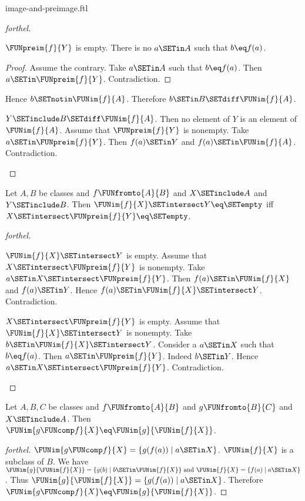 \documentclass{stex}
\begin{document}
\begin{smodule}{image-and-preimage.ftl}
\begin{proof}[forthel]
\begin{case}{$\FUNpreim{f}{Y}$ is empty.}
    There is no $a \SETin A$ such that $b \eq f(a)$.
    \begin{proof}
      Assume the contrary.
      Take $a \SETin A$ such that $b \eq f(a)$.
      Then $a \SETin \FUNpreim{f}{Y}$.
      Contradiction.
    \end{proof}

    Hence $b \SETnotin \FUNim{f}{A}$.
    Therefore $b \SETin B \SETdiff \FUNim{f}{A}$.
  \end{case}

  \begin{case}{$Y \SETinclude B \SETdiff \FUNim{f}{A}$.}
    Then no element of $Y$ is an element of $\FUNim{f}{A}$.
    Assume that $\FUNpreim{f}{Y}$ is nonempty.
    Take $a \SETin \FUNpreim{f}{Y}$.
    Then $f(a) \SETin Y$ and $f(a) \SETin \FUNim{f}{A}$.
    Contradiction.
  \end{case}
\end{proof}

\begin{proposition}[forthel,id=FOUNDATIONS_07_6295504988143616]
  Let $A, B$ be classes and $f \FUNfromto{A}{B}$ and $X \SETinclude A$ and $Y \SETinclude B$.
  Then $\FUNim{f}{X} \SETintersect Y \eq \SETempty$ iff $X \SETintersect \FUNpreim{f}{Y} \eq \SETempty$.
\end{proposition}
\begin{proof}[forthel]
  \begin{case}{$\FUNim{f}{X} \SETintersect Y$ is empty.}
    Assume that $X \SETintersect \FUNpreim{f}{Y}$ is nonempty.
    Take $a \SETin X \SETintersect \FUNpreim{f}{Y}$.
    Then $f(a) \SETin \FUNim{f}{X}$ and $f(a) \SETin Y$.
    Hence $f(a) \SETin \FUNim{f}{X} \SETintersect Y$.
    Contradiction.
  \end{case}

  \begin{case}{$X \SETintersect \FUNpreim{f}{Y}$ is empty.}
    Assume that $\FUNim{f}{X} \SETintersect Y$ is nonempty.
    Take $b \SETin \FUNim{f}{X} \SETintersect Y$.
    Consider a $a \SETin X$ such that $b \eq f(a)$.
    Then $a \SETin \FUNpreim{f}{Y}$.
    Indeed $b \SETin Y$.
    Hence $a \SETin X \SETintersect \FUNpreim{f}{Y}$.
    Contradiction.
  \end{case}
\end{proof}

\begin{proposition}[forthel,id=FOUNDATIONS_07_5628919411638272]
  Let $A, B, C$ be classes and $f \FUNfromto{A}{B}$ and $g \FUNfromto{B}{C}$ and $X \SETinclude A$.
  Then $\FUNim{g \FUNcomp f}{X} \eq \FUNim{g}{\FUNim{f}{X}}$.
\end{proposition}
\begin{proof}[forthel]
  $\FUNim{g \FUNcomp f}{X} = \{ g(f(a)) \mid a \SETin X \}$.
  $\FUNim{f}{X}$ is a subclass of $B$.
  We have $\FUNim{g}{\FUNim{f}{X}} = \{ g(b) \mid b \SETin \FUNim{f}{X} \}\text{ and }\FUNim{f}{X} = \{ f(a) \mid a \SETin X \}$.
  Thus $\FUNim{g}{\FUNim{f}{X}} = \{ g(f(a)) \mid a \SETin X \}$.
  Therefore $\FUNim{g \FUNcomp f}{X} \eq \FUNim{g}{\FUNim{f}{X}}$.
\end{proof}


\end{smodule}
\end{document}
